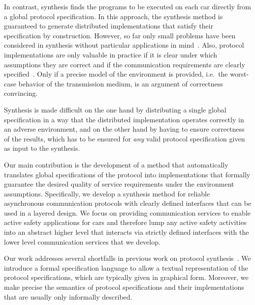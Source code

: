 \documentclass{sig-alternate}
\begin{document}
In contrast, synthesis finds the programs to be executed on each car directly from a global protocol specification. In this approach, the synthesis method is guaranteed to generate distributed implementations that satisfy their specification by construction. However, so far only small problems have been considered in synthesis without particular applications in mind~\cite{Probert, GlobalClock, Multipath}. Also, protocol implementations are only valuable in practice if it is clear under which assumptions they are correct and if the communication requirements are clearly specified~\cite{hartenstein}. Only if a precise model of the environment is provided, i.e.\ the worst-case behavior of the transmission medium, is an argument of correctness convincing.

Synthesis is made difficult on the one hand by distributing a single global specification in a way that the distributed implementation operates correctly in an adverse environment, and on the other hand by having to ensure correctness of the results, which has to be ensured for \emph{any} valid protocol specification given as input to the synthesis.

Our main contribution is the development of a method that automatically translates global specifications of the protocol into implementations that formally guarantee the desired quality of service requirements under the environment assumptions. Specifically, we develop a synthesis method for reliable asynchronous communication protocols with clearly defined interfaces that can be used in a layered design. We focus on providing communication services to enable active safety applications for cars and therefore lump any active safety activities into an abstract higher level that interacts via strictly defined interfaces with the lower level communication services that we develop. 

Our work addresses several shortfalls in previous work on protocol synthesis~\cite{ChuLiu, Ishida, Probert, Zafiropulo}. We introduce a formal specification language to allow a textual representation of the protocol specifications, which are typically given in graphical form. Moreover, we make precise the semantics of protocol specifications and their implementations that are usually only informally described.








\vspace{-.06in}
\end{document}
